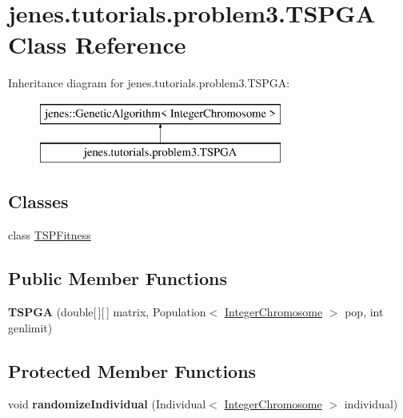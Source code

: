 \hypertarget{classjenes_1_1tutorials_1_1problem3_1_1_t_s_p_g_a}{\section{jenes.\-tutorials.\-problem3.\-T\-S\-P\-G\-A Class Reference}
\label{classjenes_1_1tutorials_1_1problem3_1_1_t_s_p_g_a}
}
Inheritance diagram for jenes.\-tutorials.\-problem3.\-T\-S\-P\-G\-A\-:\begin{figure}[H]
\begin{center}
\leavevmode
\includegraphics[height=2.000000cm]{classjenes_1_1tutorials_1_1problem3_1_1_t_s_p_g_a}
\end{center}
\end{figure}
\subsection*{Classes}
\begin{DoxyCompactItemize}
\item 
class \hyperlink{classjenes_1_1tutorials_1_1problem3_1_1_t_s_p_g_a_1_1_t_s_p_fitness}{T\-S\-P\-Fitness}
\end{DoxyCompactItemize}
\subsection*{Public Member Functions}
\begin{DoxyCompactItemize}
\item 
\hypertarget{classjenes_1_1tutorials_1_1problem3_1_1_t_s_p_g_a_aaf0ea88647e26b0bea26bcccee20085a}{{\bfseries T\-S\-P\-G\-A} (double\mbox{[}$\,$\mbox{]}\mbox{[}$\,$\mbox{]} matrix, Population$<$ \hyperlink{classjenes_1_1chromosome_1_1_integer_chromosome}{Integer\-Chromosome} $>$ pop, int genlimit)}\label{classjenes_1_1tutorials_1_1problem3_1_1_t_s_p_g_a_aaf0ea88647e26b0bea26bcccee20085a}

\end{DoxyCompactItemize}
\subsection*{Protected Member Functions}
\begin{DoxyCompactItemize}
\item 
\hypertarget{classjenes_1_1tutorials_1_1problem3_1_1_t_s_p_g_a_a50dfde1c534b9dc5f8df16d4e7512eea}{void {\bfseries randomize\-Individual} (Individual$<$ \hyperlink{classjenes_1_1chromosome_1_1_integer_chromosome}{Integer\-Chromosome} $>$ individual)}\label{classjenes_1_1tutorials_1_1problem3_1_1_t_s_p_g_a_a50dfde1c534b9dc5f8df16d4e7512eea}

\end{DoxyCompactItemize}


